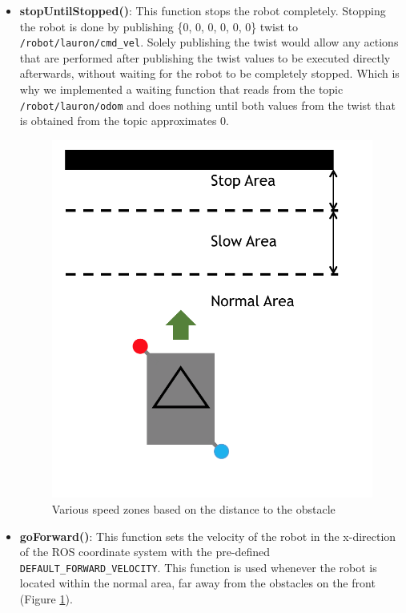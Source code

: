 \begin{itemize}
\item \textbf{stopUntilStopped()}: \label{item:stopUntilStopped}
This function stops the robot completely. Stopping the robot is done by publishing \{0, 0, 0, 0, 0, 0\} twist to \texttt{/robot/lauron/cmd\_vel}. Solely publishing the twist would allow any actions that are performed after publishing the twist values to be executed directly afterwards, without waiting for the robot to be completely stopped. Which is why we implemented a waiting function that reads from the topic \texttt{/robot/lauron/odom} and does nothing until both values from the twist that is obtained from the topic approximates 0.


\begin{figure}[htb]
\centering
\includegraphics[scale=0.6]{graphics/Zone.png}
\caption{Various speed zones based on the distance to the obstacle}
\label{Zone}
\centering
\end{figure}


\item \textbf{goForward()}: \label{item:goForward}
This function sets the velocity of the robot in the x-direction of the ROS coordinate system with the pre-defined \texttt{DEFAULT\_FORWARD\_VELOCITY}. This function is used whenever the robot is located within the normal area, far away from the obstacles on the front (Figure \ref{Zone}).


\end{itemize}
